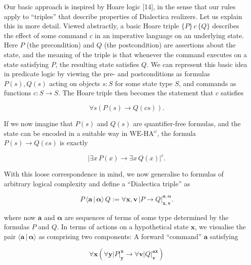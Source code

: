  
 
Our basic approach is inspired by Hoare logic [14], in the sense that our rules apply to “triples” that describe properties of Dialectica realizers. Let us explain this in more detail. Viewed abstractly, a basic Hoare triple $\{P\}\,{c}\,\{Q\}$ describes the effect of some command $c$ in an imperative language on an underlying state. Here $P$ (the precondition) and $Q$ (the postcondition) are assertions about the state, and the meaning of the triple is that whenever the command executes on a state satisfying $P$, the resulting state satisfies $Q$. We can represent this basic idea in predicate logic by viewing the pre- and postconditions as formulas $P(s),Q(s)$ acting on objects $s:S$ for some state type $S$, and commands as functions $c:S\to S$. The Hoare triple then becomes the statement that $c$ satisfies\par
  
\par  \quad  \[\forall s(P(s)\to Q(cs)).\]\quad  \quad  
  
If we now imagine that $P(s)$ and $Q(s)$ are quantifier-free formulas, and the state can be encoded in a suitable way in $\mathrm{WE}\mbox{-}\mathrm{HA}^{\omega}$, the formula $P(s)\to Q(cs)$ is exactly\par
  
\par  \quad  \[|{\exists x\,P(x)\to\exists x\,Q(x)}|^{c}.\]\quad  \quad  
  
With this loose correspondence in mind, we now generalise to formulas of arbitrary logical complexity and define a “Dialectica triple” as\par
  
\par  \quad  \[{P}\,{\langle{\bm{a}}\,|\,{\bm{\alpha}}\rangle}\,{Q}:=\forall\bm{x},\bm{v}\,|{P\to Q}|^{\bm{a},\bm{\alpha}}_{\bm{x},\bm{v}}.\]\quad  \quad  
  
where now $\bm{a}$ and $\bm{\alpha}$ are sequences of terms of some type determined by the formulas $P$ and $Q$. In terms of actions on a hypothetical state $\bm{x}$, we visualise the pair $\langle{\bm{a}}\,|\,{\bm{\alpha}}\rangle$ as comprising two components: A forward “command” $\bm{a}$ satisfying\par
  
\par  \quad  \[\forall\bm{x}\left(\forall\bm{y}|{P}|^{\bm{x}}_{\bm{y}}\to\forall\bm{v}|{Q}|^{\bm{a}\bm{x}}_{\bm{v}}\right)\]\quad  \quad  
  
